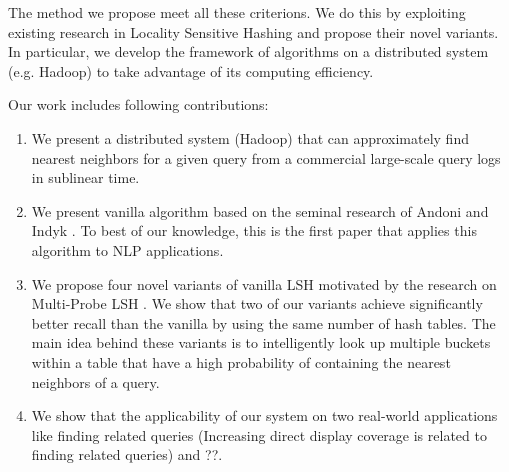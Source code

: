 The method we propose meet all these criterions. We do this by exploiting 
existing research in Locality Sensitive Hashing 
\cite{Indyk98STOC,Charikar02STOC,Andoni06FOCS,Andoni08CACM} and propose their 
novel variants. In particular, we develop the framework of  \lsh algorithms on a distributed 
system (e.g. Hadoop) to take advantage of its computing efficiency.


Our work includes following contributions: 
\begin{enumerate}
\item We present a distributed system (Hadoop) that can approximately find nearest neighbors for a given query from a commercial large-scale query logs in sublinear time. %
\item We present vanilla \lsh algorithm based on the seminal research of Andoni and Indyk  . To best of our knowledge, this is the first paper that applies this algorithm to NLP applications. 
\item We propose four novel variants of vanilla LSH motivated by the research on Multi-Probe LSH \cite{LvVLDB07}.  We show that two of our variants achieve significantly better recall than the vanilla \lsh by using the same number of hash tables. The main idea behind these variants is to intelligently look up multiple buckets within a table that have a high probability of containing the nearest neighbors of a query.  
\item  We show that the applicability of our system on two real-world applications like finding related queries (Increasing  direct display coverage is related to finding related queries) and ??.
\end{enumerate}


